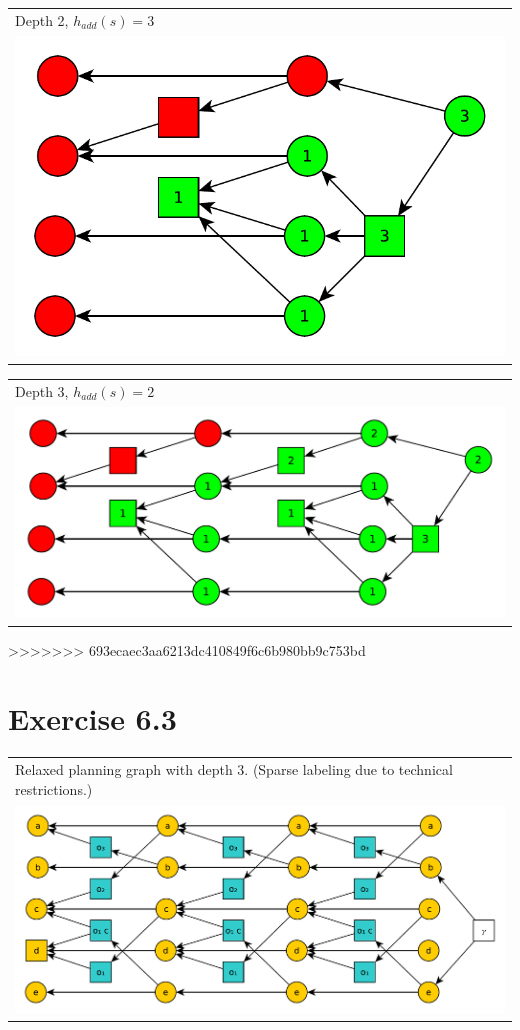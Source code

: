 \documentclass[11pt,a4paper]{article}
\begin{document}
\begin{tabular}{l} %
Depth 2, $h_{add}(s)=3$\\
\includegraphics[scale=0.5]{g622}\\
\end{tabular}

\begin{tabular}{l} %
Depth 3, $h_{add}(s)=2$\\
\includegraphics[scale=0.5]{g621}\\
\end{tabular}
>>>>>>> 693ecaec3aa6213dc410849f6c6b980bb9c753bd

\section*{Exercise 6.3}
\begin{tabular}{l} %
Relaxed planning graph with depth 3. (Sparse labeling due to technical restrictions.)\\
\includegraphics[scale=0.5]{g63}\\
\end{tabular}
\end{document}
